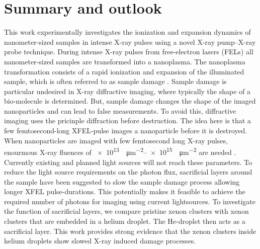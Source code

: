 \chapter{Summary and outlook}\label{ch:summary_outlook}
%
This work experimentally investigates the ionization and expansion dynamics of nanometer-sized samples in intense X-ray pulses using a novel X-ray pump--X-ray probe technique. During intense X-ray pulses from free-electron lasers (FELs) all nanometer-sized samples are transformed into a nanoplasma. The nanoplasma transformation consists of a rapid ionization and expansion of the illuminated sample, which is often referred to as sample damage \cite{Neutze-2000-Nature,Arbeiter-2011-NJP}. Sample damage is particular undesired in X-ray diffractive imaging, where typically the shape of a bio-molecule is determined. But, sample damage changes the shape of the imaged nanoparticles and can lead to false measurements. To avoid this, diffractive imaging uses the pricinple diffraction before destruction. The idea here is that a few femtosecond-long XFEL-pulse images a nanoparticle before it is destroyed. When nanoparticles are imaged with few femtosecond long X-ray pulses, enourmous X-ray fluences of \SIrange{e13}{e15}{\photons\per\square\micro\meter} are needed \citep{Hau-Riege-2005-PRE}. Currently existing and planned light sources will not reach these parameters. To reduce the light source requirements on the photon flux, sacrificial layers around the sample have been suggested to slow the sample damage process \cite{Hau-Riege-2007-PRL,Hau-Riege-2010-PRL} allowing longer XFEL pulse-durations. This potentially makes it feasible to achieve the required number of photons for imaging using current lightsources. To investigate the function of sacrificial layers, we compare pristine xenon clusters with xenon clusters that are embedded in a helium droplet. The He-droplet then acts as a sacrificial layer. This work provides strong evidence that the xenon clusters inside helium droplets show slowed X-ray induced damage processes.\\[1\baselineskip]
